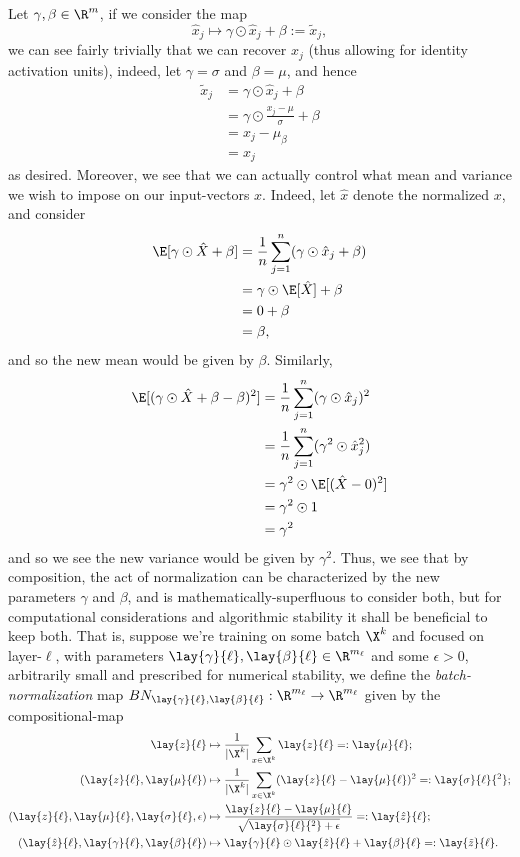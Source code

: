 Let $\gamma,\beta\in\R^m$, if we consider the map
$$\hat{x}_j\mapsto\gamma\odot\hat{x}_j+\beta:=\tilde{x}_j,$$
we can see fairly trivially that we can recover $x_j$ (thus allowing for identity activation units), indeed, let $\gamma=\sigma$ and $\beta=\mu$, and hence
\begin{align*}
	\tilde{x}_j&=\gamma\odot\hat{x}_j+\beta\\
	&=\gamma\odot\frac{x_j-\mu}{\sigma}+\beta\\
	&=x_j-\mu_\beta\\
	&=x_j
\end{align*}
as desired.  Moreover, we see that we can actually control what mean and variance we wish to impose on our input-vectors $x$.  Indeed, let $\hat{x}$ denote the normalized $x$, and consider
\begin{align*}
	\E[\gamma\odot \hat{X}+\beta]&=\frac{1}{n}\sum_{j=1}^n(\gamma\odot \hat{x}_j+\beta)\\
	&=\gamma\odot\E[\hat{X}]+\beta\\
	&=0+\beta\\
	&=\beta,
\end{align*}
and so the new mean would be given by $\beta$.  Similarly,
\begin{align*}
	\E[(\gamma\odot \hat{X}+\beta-\beta)^2]&=\frac{1}{n}\sum_{j=1}^n(\gamma\odot \hat{x}_j)^2\\
	&=\frac{1}{n}\sum_{j=1}^n(\gamma^2\odot \hat{x}_j^2)\\
	&=\gamma^2\odot\E[(\hat{X}-0)^2]\\
	&=\gamma^2\odot1\\
	&=\gamma^2
\end{align*}
and so we see the new variance would be given by $\gamma^2$.  Thus, we see that by composition, the act of normalization can be characterized by the new parameters $\gamma$ and $\beta$, and is mathematically-superfluous to consider both, but for computational considerations and algorithmic stability it shall be beneficial to keep both.  That is, suppose we're training on some batch $\X^k$ and focused on layer-$\ell$, with parameters $\lay{\gamma}{\ell},\lay{\beta}{\ell}\in\R^{m_\ell}$ and some $\epsilon>0$, arbitrarily small and prescribed for numerical stability, we define the \textit{batch-normalization} map $BN_{\lay{\gamma}{\ell},\lay{\beta}{\ell}}:\R^{m_\ell}\to\R^{m_\ell}$ given by the compositional-map
\begin{align*}
	\lay{z}{\ell}&\mapsto\frac{1}{|\X^k|}\sum_{x\in\X^k}\lay{z}{\ell}=:\lay{\mu}{\ell};\\
	(\lay{z}{\ell},\lay{\mu}{\ell})&\mapsto\frac{1}{|\X^k|}\sum_{x\in\X^k}(\lay{z}{\ell}-\lay{\mu}{\ell})^2=:\lay{\sigma}{\ell}{^2};\\
	(\lay{z}{\ell},\lay{\mu}{\ell},\lay{\sigma}{\ell},\epsilon)&\mapsto\frac{\lay{z}{\ell}-\lay{\mu}{\ell}}{\sqrt{\lay{\sigma}{\ell}{^2}+\epsilon}}=:\lay{\hat{z}}{\ell};\\
	(\lay{\hat{z}}{\ell},\lay{\gamma}{\ell},\lay{\beta}{\ell})&\mapsto \lay{\gamma}{\ell}\odot\lay{\hat{z}}{\ell}+\lay{\beta}{\ell}=:\lay{\tilde{z}}{\ell}.
\end{align*}


